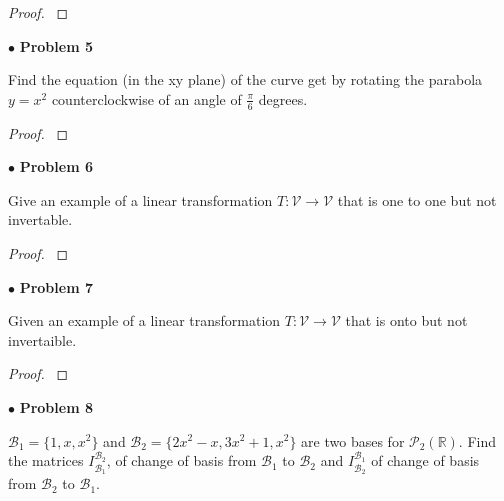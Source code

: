 \documentclass{article}
\begin{document}
\begin{proof}
$ $\newline
\end{proof}

\newpage
$ \bullet$ \textbf{Problem 5}
\medskip

\begin{itshape}
Find the equation (in the xy plane) of the curve get by rotating the parabola $y=x^2$ counterclockwise of an angle of $\frac{\pi}{6}$ degrees.
\end{itshape}
\medskip

\begin{proof}
$ $\newline
\end{proof}

\newpage
$ \bullet$ \textbf{Problem 6}
\medskip

\begin{itshape}
Give an example of a linear transformation $T: \mathcal{V} \to \mathcal{V}$ that is one to one but not invertable.
\end{itshape}
\medskip

\begin{proof}
$ $\newline
\end{proof}

\newpage
$ \bullet$ \textbf{Problem 7}
\medskip

\begin{itshape}
Given an example of a linear transformation $T: \mathcal{V} \to \mathcal{V}$ that is onto but not invertaible.
\end{itshape}
\medskip

\begin{proof}
$ $\newline
\end{proof}

\newpage
$ \bullet$ \textbf{Problem 8}
\medskip

\begin{itshape}
$\mathcal{B}_1 = \{ 1, x ,x^2 \}$ and $\mathcal{B}_2 = \{ 2x^2-x, 3x^2+1, x^2 \}$ are two bases for $\mathcal{P}_2(\mathbb{R})$. Find the matrices $I_{\mathcal{B}_1}^{\mathcal{B}_2}$, of change of basis from $\mathcal{B}_1$ to $\mathcal{B}_2$ and $I_{\mathcal{B}_2}^{\mathcal{B}_1}$ of change of basis from $\mathcal{B}_2$ to $\mathcal{B}_1$.
\end{itshape}
\end{document}
